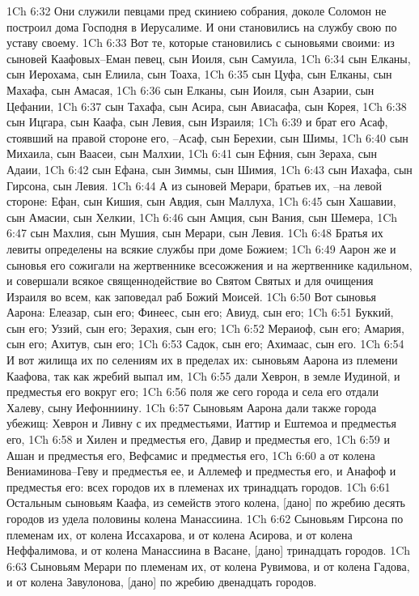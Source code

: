 1Ch 6:32  Они служили певцами пред скиниею собрания, доколе Соломон не построил дома Господня в Иерусалиме. И они становились на службу свою по уставу своему.
1Ch 6:33  Вот те, которые становились с сыновьями своими: из сыновей Каафовых--Еман певец, сын Иоиля, сын Самуила,
1Ch 6:34  сын Елканы, сын Иерохама, сын Елиила, сын Тоаха,
1Ch 6:35  сын Цуфа, сын Елканы, сын Махафа, сын Амасая,
1Ch 6:36  сын Елканы, сын Иоиля, сын Азарии, сын Цефании,
1Ch 6:37  сын Тахафа, сын Асира, сын Авиасафа, сын Корея,
1Ch 6:38  сын Ицгара, сын Каафа, сын Левия, сын Израиля;
1Ch 6:39  и брат его Асаф, стоявший на правой стороне его, --Асаф, сын Берехии, сын Шимы,
1Ch 6:40  сын Михаила, сын Ваасеи, сын Малхии,
1Ch 6:41  сын Ефния, сын Зераха, сын Адаии,
1Ch 6:42  сын Ефана, сын Зиммы, сын Шимия,
1Ch 6:43  сын Иахафа, сын Гирсона, сын Левия.
1Ch 6:44  А из сыновей Мерари, братьев их, --на левой стороне: Ефан, сын Кишия, сын Авдия, сын Маллуха,
1Ch 6:45  сын Хашавии, сын Амасии, сын Хелкии,
1Ch 6:46  сын Амция, сын Вания, сын Шемера,
1Ch 6:47  сын Махлия, сын Мушия, сын Мерари, сын Левия.
1Ch 6:48  Братья их левиты определены на всякие службы при доме Божием;
1Ch 6:49  Аарон же и сыновья его сожигали на жертвеннике всесожжения и на жертвеннике кадильном, и совершали всякое священнодействие во Святом Святых и для очищения Израиля во всем, как заповедал раб Божий Моисей.
1Ch 6:50  Вот сыновья Аарона: Елеазар, сын его; Финеес, сын его; Авиуд, сын его;
1Ch 6:51  Буккий, сын его; Уззий, сын его; Зерахия, сын его;
1Ch 6:52  Мераиоф, сын его; Амария, сын его; Ахитув, сын его;
1Ch 6:53  Садок, сын его; Ахимаас, сын его.
1Ch 6:54  И вот жилища их по селениям их в пределах их: сыновьям Аарона из племени Каафова, так как жребий выпал им,
1Ch 6:55  дали Хеврон, в земле Иудиной, и предместья его вокруг его;
1Ch 6:56  поля же сего города и села его отдали Халеву, сыну Иефонниину.
1Ch 6:57  Сыновьям Аарона дали также города убежищ: Хеврон и Ливну с их предместьями, Иаттир и Ештемоа и предместья его,
1Ch 6:58  и Хилен и предместья его, Давир и предместья его,
1Ch 6:59  и Ашан и предместья его, Вефсамис и предместья его,
1Ch 6:60  а от колена Вениаминова--Геву и предместья ее, и Аллемеф и предместья его, и Анафоф и предместья его: всех городов их в племенах их тринадцать городов.
1Ch 6:61  Остальным сыновьям Каафа, из семейств этого колена, [дано] по жребию десять городов из удела половины колена Манассиина.
1Ch 6:62  Сыновьям Гирсона по племенам их, от колена Иссахарова, и от колена Асирова, и от колена Неффалимова, и от колена Манассиина в Васане, [дано] тринадцать городов.
1Ch 6:63  Сыновьям Мерари по племенам их, от колена Рувимова, и от колена Гадова, и от колена Завулонова, [дано] по жребию двенадцать городов.

